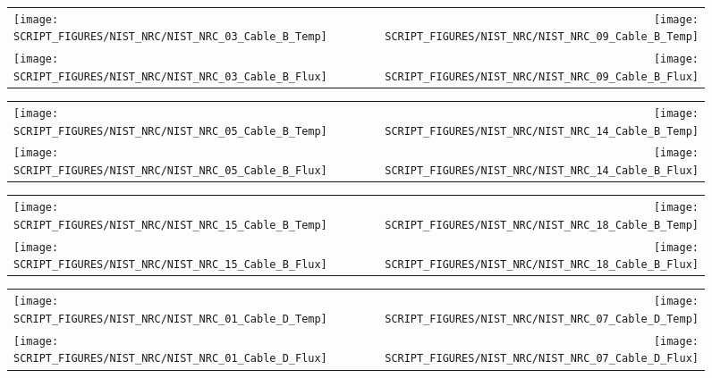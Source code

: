 \clearpage

\begin{figure}[p]
\begin{tabular*}{\textwidth}{l@{\extracolsep{\fill}}r}
\texttt{[image: SCRIPT\_FIGURES/NIST\_NRC/NIST\_NRC\_03\_Cable\_B\_Temp]} &
\texttt{[image: SCRIPT\_FIGURES/NIST\_NRC/NIST\_NRC\_09\_Cable\_B\_Temp]} \\
\texttt{[image: SCRIPT\_FIGURES/NIST\_NRC/NIST\_NRC\_03\_Cable\_B\_Flux]} &
\texttt{[image: SCRIPT\_FIGURES/NIST\_NRC/NIST\_NRC\_09\_Cable\_B\_Flux]}
\end{tabular*}
\label{NIST_NRC_B_3_and_9}
\end{figure}

\begin{figure}[p]
\begin{tabular*}{\textwidth}{l@{\extracolsep{\fill}}r}
\texttt{[image: SCRIPT\_FIGURES/NIST\_NRC/NIST\_NRC\_05\_Cable\_B\_Temp]} &
\texttt{[image: SCRIPT\_FIGURES/NIST\_NRC/NIST\_NRC\_14\_Cable\_B\_Temp]} \\
\texttt{[image: SCRIPT\_FIGURES/NIST\_NRC/NIST\_NRC\_05\_Cable\_B\_Flux]} &
\texttt{[image: SCRIPT\_FIGURES/NIST\_NRC/NIST\_NRC\_14\_Cable\_B\_Flux]}
\end{tabular*}
\label{NIST_NRC_B_5_and_14}
\end{figure}

\clearpage

\begin{figure}[p]
\begin{tabular*}{\textwidth}{l@{\extracolsep{\fill}}r}
\texttt{[image: SCRIPT\_FIGURES/NIST\_NRC/NIST\_NRC\_15\_Cable\_B\_Temp]} &
\texttt{[image: SCRIPT\_FIGURES/NIST\_NRC/NIST\_NRC\_18\_Cable\_B\_Temp]} \\
\texttt{[image: SCRIPT\_FIGURES/NIST\_NRC/NIST\_NRC\_15\_Cable\_B\_Flux]} &
\texttt{[image: SCRIPT\_FIGURES/NIST\_NRC/NIST\_NRC\_18\_Cable\_B\_Flux]}
\end{tabular*}
\label{NIST_NRC_B_15_and_18}
\end{figure}

\clearpage

\begin{figure}[p]
\begin{tabular*}{\textwidth}{l@{\extracolsep{\fill}}r}
\texttt{[image: SCRIPT\_FIGURES/NIST\_NRC/NIST\_NRC\_01\_Cable\_D\_Temp]} &
\texttt{[image: SCRIPT\_FIGURES/NIST\_NRC/NIST\_NRC\_07\_Cable\_D\_Temp]} \\
\texttt{[image: SCRIPT\_FIGURES/NIST\_NRC/NIST\_NRC\_01\_Cable\_D\_Flux]} &
\texttt{[image: SCRIPT\_FIGURES/NIST\_NRC/NIST\_NRC\_07\_Cable\_D\_Flux]}
\end{tabular*}
\label{NIST_NRC_D_1_and_7}
\end{figure}

